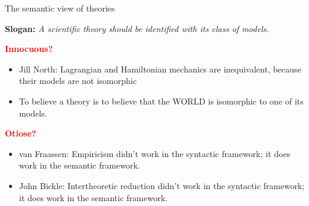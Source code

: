 \documentclass[8pt]{beamer}
\begin{document}
\begin{frame}{The semantic view of theories}

  {\Large \textbf{Slogan:} \newline \emph{A scientific theory should be
      identified with its class of models.}}


\bigskip \textbf{\textcolor{red}{Innocuous?}}

\begin{itemize}
\item Jill North: Lagrangian and Hamiltonian mechanics are
  inequivalent, because their models are not isomorphic
\item To believe a theory is to believe that the WORLD is isomorphic
  to one of its models.
\end{itemize}


\bigskip \textbf{\textcolor{red}{Otiose?}}

\begin{itemize}
\item van Fraassen: Empiricism didn't work in the syntactic framework;
  it does work in the semantic framework.
\item John Bickle: Intertheoretic reduction didn't work in the
  syntactic framework; it does work in the semantic framework.
\end{itemize}






\end{frame}
\end{document}
